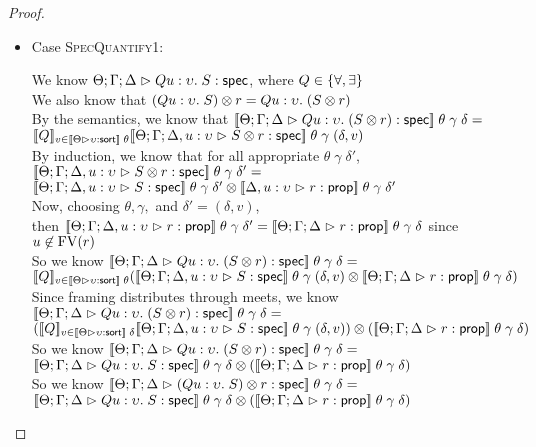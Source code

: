 \begin{proof}
\begin{itemize}
    \item Case \textsc{SpecQuantify1}:
      \begin{tabbedproof}
        \oo We know $\judgeS{Q u:\upsilon.\; S}$, where $Q \in \setof{\forall, \exists}$ \\
        \oo We also know that $\Frame{(Q u:\upsilon.\; S)}{r} = Q u:\upsilon.\; (\Frame{S}{r})$ \\
        \oo By the semantics, we know that $\interp{\judgeS{Q u:\upsilon.\; (\Frame{S}{r)}}}\;\theta\;\gamma\;\delta = $ \\
        \oox $\interp{Q}_{v \in \interp{\judgeSort{\upsilon}}\;\theta} \interp{\judgeS[\Theta; \Gamma; \Delta, u:\upsilon]{\Frame{S}{r}}}\;\theta\;\gamma\;(\delta, v)$\\
        \oo By induction, we know that for all appropriate $\theta\;\gamma\;\delta'$, 
               $\interp{\judgeS[\Theta; \Gamma; \Delta, u:\upsilon]{\Frame{S}{r}}}\;\theta\;\gamma\;\delta' = $ \\
        \oox $\Frame{\interp{\judgeS[\Theta; \Gamma; \Delta, u:\upsilon]{S}}\;\theta\;\gamma\;\delta'}{\interp{\judgeA[\Delta, u:\upsilon]{r}{\assert}}\;\theta\;\gamma\;\delta'}$ \\
        \oo Now, choosing $\theta, \gamma,$ and  $\delta' = (\delta,v)$, \\
        \oox then $\interp{\judgeA[\Theta;\Gamma;\Delta, u:\upsilon]{r}{\assert}}\;\theta\;\gamma\;\delta' = 
                                                   \interp{\judgeA{r}{\assert}}\;\theta\;\gamma\;\delta$ since $u \not\in \FV{r}$ \\
        \oo So we know $\interp{\judgeS{Q u:\upsilon.\; (\Frame{S}{r)}}}\;\theta\;\gamma\;\delta = $ \\
        \oox $\interp{Q}_{v \in \interp{\judgeSort{\upsilon}}\;\theta} (\Frame{\interp{\judgeS[\Theta;\Gamma;\Delta, u:\upsilon]{S}}\;\theta\;\gamma\;(\delta,v)}{\interp{\judgeA{r}{\assert}}\;\theta\;\gamma\;\delta})$ \\
        \oo Since framing distributes through meets, we know $\interp{\judgeS{Q u:\upsilon.\; (\Frame{S}{r)}}}\;\theta\;\gamma\;\delta = $ \\
        \oox $\Frame{(\interp{Q}_{v \in \interp{\judgeSort{\upsilon}}\;\delta} \interp{\judgeS[\Theta; \Gamma; \Delta, u:\upsilon]{S}}\;\theta\;\gamma\;(\delta, v))}{(\interp{\judgeA{r}{\assert}}\;\theta\;\gamma\;\delta)}$ \\
        \oo So we know $\interp{\judgeS{Q u:\upsilon.\; (\Frame{S}{r)}}}\;\theta\;\gamma\;\delta = $ \\
        \oox $\Frame{\interp{\judgeS{Q u:\upsilon.\;S}}\;\theta\;\gamma\;\delta}{(\interp{\judgeA{r}{\assert}}\;\theta\;\gamma\;\delta)}$ \\
        \oo So we know $\interp{\judgeS{\Frame{(Q u:\upsilon.\; S)}{r}}}\;\theta\;\gamma\;\delta = $ \\
        \oox $\Frame{\interp{\judgeS{Q u:\upsilon.\;S}}\;\theta\;\gamma\;\delta}{(\interp{\judgeA{r}{\assert}}\;\theta\;\gamma\;\delta)}$ \\        
      \end{tabbedproof}


\end{itemize}
\end{proof}

